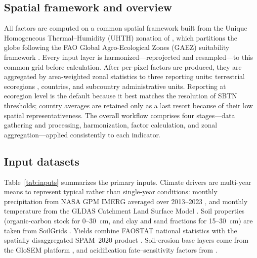 \documentclass[11pt]{article}
\begin{document}
\subsection{Spatial framework and overview}
All factors are computed on a common spatial framework built from the Unique Homogeneous
Thermal--Humidity (UHTH) zonation of \citet{morais2019}, which partitions the globe
following the FAO Global Agro-Ecological Zones (GAEZ) suitability framework
\citep{gaez2012}. Every input layer is harmonized---reprojected and resampled---to this
common grid before calculation. After per-pixel factors are produced, they are
aggregated by area-weighted zonal statistics to three reporting units: terrestrial
ecoregions \citep{olson2001}, countries, and subcountry administrative units. Reporting
at ecoregion level is the default because it best matches the resolution of SBTN
thresholds; country averages are retained only as a last resort because of their low
spatial representativeness. The overall workflow comprises four stages---data gathering
and processing, harmonization, factor calculation, and zonal aggregation---applied
consistently to each indicator.

\subsection{Input datasets}
Table~\ref{tab:inputs} summarizes the primary inputs. Climate drivers are multi-year
means to represent typical rather than single-year conditions: monthly precipitation
from NASA GPM IMERG averaged over 2013--2023 \citep{huffman2020}, and monthly
temperature from the GLDAS Catchment Land Surface Model \citep{rodell2004}. Soil
properties (organic-carbon stock for 0--30~cm, and clay and sand fractions for
15--30~cm) are taken from SoilGrids \citep{poggio2021}. Yields combine FAOSTAT national
statistics \citep{faostat} with the spatially disaggregated SPAM~2020 product
\citep{spam2020}. Soil-erosion base layers come from the GloSEM platform
\citep{borrelli2017,borrelli2022,panagos2015}, and acidification fate--sensitivity
factors from \citet{roy2014}.
\end{document}
